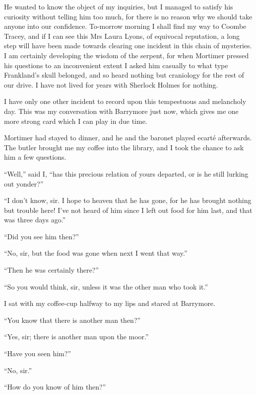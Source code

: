 \documentclass[paper=a5,BCOR=7mm,twoside,DIV=calc,12pt,usegeometry,openany,chapterprefix,endperiod,headings=big]{scrbook} %
\begin{document}
He wanted to know the object of my inquiries, but I managed to satisfy his curiosity without telling him too much, for there is no reason why we should take anyone into our confidence. To-morrow morning I shall find my way to Coombe Tracey, and if I can see this Mrs Laura Lyons, of equivocal reputation, a long step will have been made towards clearing one incident in this chain of mysteries. I am certainly developing the wisdom of the serpent, for when Mortimer pressed his questions to an inconvenient extent I asked him casually to what type Frankland's skull belonged, and so heard nothing but craniology for the rest of our drive. I have not lived for years with Sherlock Holmes for nothing.

I have only one other incident to record upon this tempestuous and melancholy day. This was my conversation with Barrymore just now, which gives me one more strong card which I can play in due time.

Mortimer had stayed to dinner, and he and the baronet played ecarté afterwards. The butler brought me my coffee into the library, and I took the chance to ask him a few questions.

\enquote{Well,} said I, \enquote{has this precious relation of yours departed, or is he still lurking out yonder?}

\enquote{I don't know, sir. I hope to heaven that he has gone, for he has brought nothing but trouble here! I've not heard of him since I left out food for him last, and that was three days ago.}

\enquote{Did you see him then?}

\enquote{No, sir, but the food was gone when next I went that way.}

\enquote{Then he was certainly there?}

\enquote{So you would think, sir, unless it was the other man who took it.}

I sat with my coffee-cup halfway to my lips and stared at Barrymore.

\enquote{You know that there is another man then?}

\enquote{Yes, sir; there is another man upon the moor.}

\enquote{Have you seen him?}

\enquote{No, sir.}

\enquote{How do you know of him then?}
\end{document}

